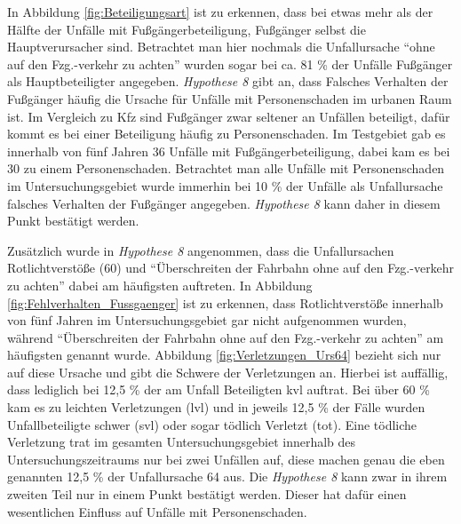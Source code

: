 In Abbildung \ref{fig:Beteiligungsart} ist zu erkennen, dass bei etwas mehr als der Hälfte der Unfälle mit Fußgängerbeteiligung, Fußgänger selbst die Hauptverursacher sind. Betrachtet man hier nochmals die Unfallursache \enquote{ohne auf den Fzg.-verkehr zu achten} wurden sogar bei ca. 81 \% der Unfälle Fußgänger als Hauptbeteiligter angegeben. \textit{Hypothese 8} gibt an, dass Falsches Verhalten der Fußgänger häufig die Ursache für Unfälle mit Personenschaden im urbanen Raum ist. Im Vergleich zu Kfz sind Fußgänger zwar seltener an Unfällen beteiligt, dafür kommt es bei einer Beteiligung häufig zu Personenschaden. Im Testgebiet gab es innerhalb von fünf Jahren 36 Unfälle mit Fußgängerbeteiligung, dabei kam es bei 30 zu einem Personenschaden. Betrachtet man alle Unfälle mit Personenschaden im Untersuchungsgebiet wurde immerhin bei 10 \% der Unfälle als Unfallursache falsches Verhalten der Fußgänger angegeben. \textit{Hypothese 8} kann daher in diesem Punkt bestätigt werden.

Zusätzlich wurde in \textit{Hypothese 8} angenommen, dass die Unfallursachen Rotlichtverstöße (60) und \enquote{Überschreiten der Fahrbahn ohne auf den Fzg.-verkehr zu achten} dabei am häufigsten auftreten. In Abbildung \ref{fig:Fehlverhalten_Fussgaenger} ist zu erkennen, dass Rotlichtverstöße innerhalb von fünf Jahren im Untersuchungsgebiet gar nicht aufgenommen wurden, während \enquote{Überschreiten der Fahrbahn ohne auf den Fzg.-verkehr zu achten} am häufigsten genannt wurde. Abbildung \ref{fig:Verletzungen_Urs64} bezieht sich nur auf diese Ursache und gibt die Schwere der Verletzungen an. Hierbei ist auffällig, dass lediglich bei 12,5 \% der am Unfall Beteiligten \ac{kvl} auftrat. Bei über 60 \% kam es zu leichten Verletzungen (lvl) und in jeweils 12,5 \% der Fälle wurden Unfallbeteiligte schwer (svl) oder sogar tödlich Verletzt (tot). Eine tödliche Verletzung trat im gesamten Untersuchungsgebiet innerhalb des Untersuchungszeitraums nur bei zwei Unfällen auf, diese machen genau die eben genannten 12,5 \% der Unfallursache 64 aus. Die \textit{Hypothese 8} kann zwar in ihrem zweiten Teil nur in einem Punkt bestätigt werden. Dieser hat dafür einen wesentlichen Einfluss auf Unfälle mit Personenschaden.

